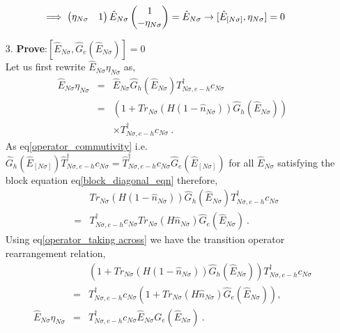 \documentclass[12pt,a4paper]{article}
\begin{document}
\begin{itemize}
\begin{eqnarray}
&&\implies \begin{pmatrix} \eta_{N\sigma} & 1\end{pmatrix}\hat{E}_{N\sigma}\begin{pmatrix}
1 \\ -\eta_{N\sigma}
\end{pmatrix} =\hat{E}_{N\sigma} \to [\hat{E}_{[N\sigma]},\eta_{N\sigma}]=0\hspace*{0.5cm}~~~~\label{commutation_block_ham_transition_op}
\end{eqnarray}
\item[3.] \textbf{Prove}:$[\hat{E}_{N\sigma},\hat{G}_{e}(\hat{E}_{N\sigma})] = 0$\\
Let us first rewrite $\hat{E}_{N\sigma}\eta_{N\sigma}$ as,
\begin{eqnarray}
\hat{E}_{N\sigma}\eta_{N\sigma} &= &\hat{E}_{N\sigma}\hat{G}_{h}(\hat{E}_{N\sigma})T^{\dagger}_{N\sigma,e-h}c_{N\sigma}\nonumber\\
 &=& \left(1+Tr_{N\sigma}(H(1-\hat{n}_{N\sigma}))\hat{G}_{h}(\hat{E}_{N\sigma})\right)\nonumber\\
 &&\times T^{\dagger}_{N\sigma,e-h}c_{N\sigma}~.~~~~~
\end{eqnarray}
As eq\eqref{operator_commutivity} i.e. $\hat{G}_{h}(\hat{E}_{[N\sigma]})\hat{T}^{\dagger}_{N\sigma,e-h}c_{N\sigma} = \hat{T}^{\dagger}_{N\sigma,e-h}c_{N\sigma}\hat{G}_{e}(\hat{E}_{[N\sigma]})$ for all $\hat{E}_{N\sigma}$ satisfying the block equation eq\eqref{block_diagonal_eqn} therefore,
\begin{eqnarray}
&&Tr_{N\sigma}(H(1-\hat{n}_{N\sigma}))\hat{G}_{h}(\hat{E}_{N\sigma})T^{\dagger}_{N\sigma,e-h}c_{N\sigma}\nonumber\\
& =&T^{\dagger}_{N\sigma,e-h}c_{N\sigma}Tr_{N\sigma}(H\hat{n}_{N\sigma}) \hat{G}_{e}(\hat{E}_{N\sigma})~.\label{operator_taking across}
\end{eqnarray}
Using eq\eqref{operator_taking across} we have the transition operator rearrangement  relation,
\begin{eqnarray}
&&\left(1+Tr_{N\sigma}(H(1-\hat{n}_{N\sigma}))\hat{G}_{h}(\hat{E}_{N\sigma})\right)T^{\dagger}_{N\sigma,e-h}c_{N\sigma} \nonumber\\
&=&T^{\dagger}_{N\sigma,e-h}c_{N\sigma}\left(1+Tr_{N\sigma}(H\hat{n}_{N\sigma})\hat{G}_{e}(\hat{E}_{N\sigma})\right),~\nonumber\\
\hat{E}_{N\sigma}\eta_{N\sigma}&=&T^{\dagger}_{N\sigma,e-h}c_{N\sigma}\hat{E}_{N\sigma}G_{e}(\hat{E}_{N\sigma})~.
\end{eqnarray}

\end{itemize}
\end{document}

